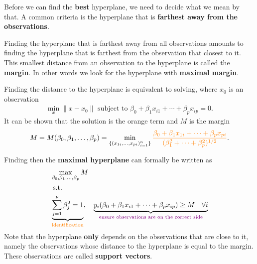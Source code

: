 \documentclass[aspectratio=169,10pt]{beamer}
\begin{document}
\begin{frame}{\secname}{\subsecname}
  Before we can find the \textbf{best} hyperplane, we need to decide what we mean by that.
  A common criteria is the hyperplane that is \textbf{farthest away from the observations}.

  Finding the hyperplane that is farthest away from all observations amounts to finding the hyperplane that is farthest from the observation that closest to it.
  This smallest distance from an observation to the hyperplane is called the \textbf{margin}.
  In other words we look for the hyperplane with \textbf{maximal margin}.

  Finding the distance to the hyperplane is equivalent to solving, where $x_0$ is an observation 
  \begin{align}
    \min_x \| x - x_0 \| \text{ subject to } \beta_0 + \beta_1x_{i1} + \cdots + \beta_p x_{ip} = 0.
  \end{align}
  It can be shown that the solution is the {\color{orange} orange term} and $M$ is the margin
  \begin{align}
    M = M(\beta_0, \beta_1, \ldots, \beta_p)
    = \min_{\{ (x_{1i}, \ldots, x_{pi})^n_{i = 1}\}}{\color{orange}\frac{\beta_0 + \beta_1 x_{1i} + \cdots + \beta_px_{pi}}{(\beta_1^2 + \cdots + \beta_p^2)^{1/2}}}.
  \end{align}
\end{frame}

\begin{frame}{\secname}{\subsecname}
  Finding then the \textbf{maximal hyperplane} can formally be written as
  \begin{align}
    &\max_{\beta_0, \beta_1, \ldots, \beta_p} M \\
    &\text{ s.t.} \nonumber \\
    & \underbrace{\sum_{j=1}^p \beta_j^2 = 1}_{{\color{orange}\text{identification}}}, \quad \underbrace{y_i(\beta_0 + \beta_1x_{i1} + \cdots + \beta_px_{ip}) \geq M \quad \forall i}_{{\color{violet}\text{ensure observations are on the correct side}}}
  \end{align}
  Note that the hyperplane \textbf{only} depends on the observations that are close to it, namely the observations whose distance to the hyperplane is equal to the margin.
  These observations are called \textbf{support vectors}.
\end{frame}
\end{document}
